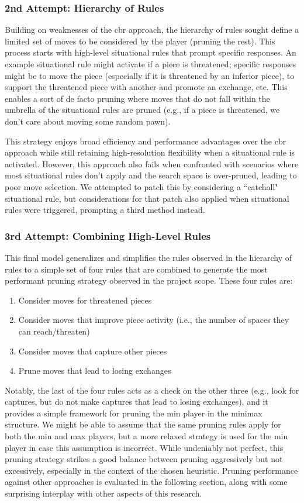 \documentclass[letterpaper]{article}
\begin{document}
\subsubsection{2nd Attempt: Hierarchy of Rules}
Building on weaknesses of the \acrshort{cbr} approach, the hierarchy of rules sought define a limited set of moves to be considered by the player (pruning the rest).  This process starts with high-level situational rules that prompt specific responses.  An example situational rule might activate if a piece is threatened; specific responses might be to move the piece (especially if it is threatened by an inferior piece), to support the threatened piece with another and promote an exchange, etc.  This enables a sort of de facto pruning where moves that do not fall within the umbrella of the situational rules are pruned (e.g., if a piece is threatened, we don't care about moving some random pawn).

This strategy enjoys broad efficiency and performance advantages over the \acrshort{cbr} approach while still retaining high-resolution flexibility when a situational rule is activated.  However, this approach also fails when confronted with scenarios where most situational rules don't apply and the search space is over-pruned, leading to poor move selection.  We attempted to patch this by considering a ``catchall" situational rule, but considerations for that patch also applied when situational rules were triggered, prompting a third method instead.

\subsubsection{3rd Attempt: Combining High-Level Rules}
This final model generalizes and simplifies the rules observed in the hierarchy of rules to a simple set of four rules that are combined to generate the most performant pruning strategy observed in the project scope.  These four rules are:
\begin{enumerate}
    \item Consider moves for threatened pieces
    \item Consider moves that improve piece activity (i.e., the number of spaces they can reach/threaten)
    \item Consider moves that capture other pieces
    \item Prune moves that lead to losing exchanges
\end{enumerate}
Notably, the last of the four rules acts as a check on the other three (e.g., look for captures, but do not make captures that lead to losing exchanges), and it provides a simple framework for pruning the min player in the minimax structure.  We might be able to assume that the same pruning rules apply for both the min and max players, but a more relaxed strategy is used for the min player in case this assumption is incorrect.  While undeniably not perfect, this pruning strategy strikes a good balance between pruning aggressively but not excessively, especially in the context of the chosen heuristic.  Pruning performance against other approaches is evaluated in the following section, along with some surprising interplay with other aspects of this research.
\end{document}
